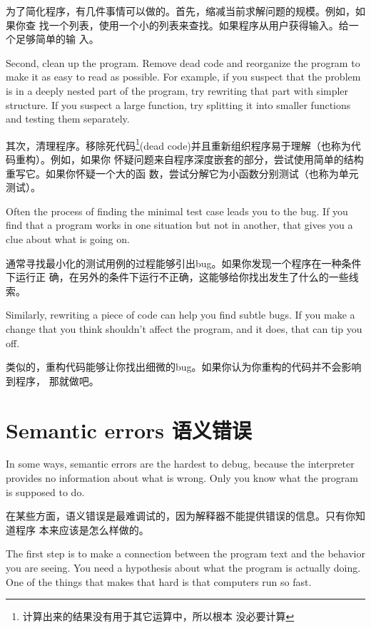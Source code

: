 \documentclass[10pt]{book}
\begin{document}
\begin{CJK}{UTF8}{gbsn}
为了简化程序，有几件事情可以做的。首先，缩减当前求解问题的规模。例如，如果你查
找一个列表，使用一个小的列表来查找。如果程序从用户获得输入。给一个足够简单的输
入。

Second, clean up the program.  Remove dead code and reorganize the
program to make it as easy to read as possible.  For example, if you
suspect that the problem is in a deeply nested part of the program,
try rewriting that part with simpler structure.  If you suspect a
large function, try splitting it into smaller functions and testing them
separately.

其次，清理程序。移除死代码\footnote{计算出来的结果没有用于其它运算中，所以根本
没必要计算}(dead code)并且重新组织程序易于理解（也称为代码重构）。例如，如果你
怀疑问题来自程序深度嵌套的部分，尝试使用简单的结构重写它。如果你怀疑一个大的函
数，尝试分解它为小函数分别测试（也称为单元测试）。

Often the process of finding the minimal test case leads you to the
bug.  If you find that a program works in one situation but not in
another, that gives you a clue about what is going on.

通常寻找最小化的测试用例的过程能够引出bug。如果你发现一个程序在一种条件下运行正
确，在另外的条件下运行不正确，这能够给你找出发生了什么的一些线索。

Similarly, rewriting a piece of code can help you find subtle
bugs.  If you make a change that you think shouldn't affect the
program, and it does, that can tip you off.

类似的，重构代码能够让你找出细微的bug。如果你认为你重构的代码并不会影响到程序，
那就做吧。

\section{Semantic errors 语义错误}

In some ways, semantic errors are the hardest to debug,
because the interpreter provides no information
about what is wrong.  Only you know what the program is supposed to
do.

在某些方面，语义错误是最难调试的，因为解释器不能提供错误的信息。只有你知道程序
本来应该是怎么样做的。

The first step is to make a connection between the program
text and the behavior you are seeing.  You need a hypothesis
about what the program is actually doing.  One of the things
that makes that hard is that computers run so fast.


\end{CJK}
\end{document}
